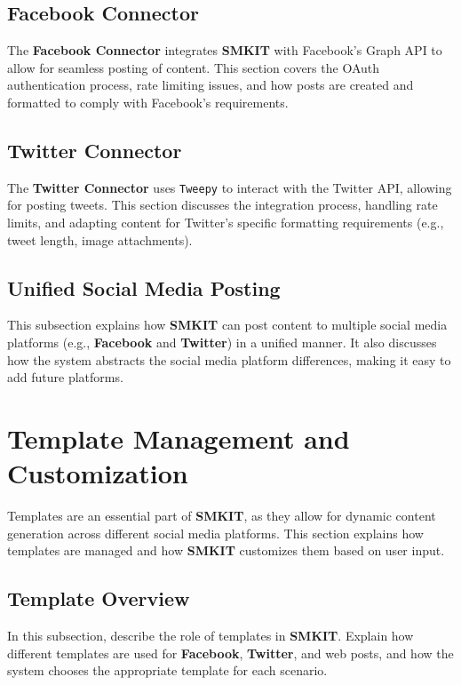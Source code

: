\subsection{Facebook Connector}
\label{subsec:facebook_connector}
The \textbf{Facebook Connector} integrates \textbf{SMKIT} with Facebook’s Graph API to allow for seamless posting of content. This section covers the OAuth authentication process, rate limiting issues, and how posts are created and formatted to comply with Facebook's requirements.

\subsection{Twitter Connector}
\label{subsec:twitter_connector}
The \textbf{Twitter Connector} uses \texttt{Tweepy} to interact with the Twitter API, allowing for posting tweets. This section discusses the integration process, handling rate limits, and adapting content for Twitter's specific formatting requirements (e.g., tweet length, image attachments).

\subsection{Unified Social Media Posting}
\label{subsec:unified_social_media_posting}
This subsection explains how \textbf{SMKIT} can post content to multiple social media platforms (e.g., \textbf{Facebook} and \textbf{Twitter}) in a unified manner. It also discusses how the system abstracts the social media platform differences, making it easy to add future platforms.

\section{Template Management and Customization}
\label{sec:template_management_and_customization}
Templates are an essential part of \textbf{SMKIT}, as they allow for dynamic content generation across different social media platforms. This section explains how templates are managed and how \textbf{SMKIT} customizes them based on user input.

\subsection{Template Overview}
\label{subsec:template_overview}
In this subsection, describe the role of templates in \textbf{SMKIT}. Explain how different templates are used for \textbf{Facebook}, \textbf{Twitter}, and web posts, and how the system chooses the appropriate template for each scenario.

